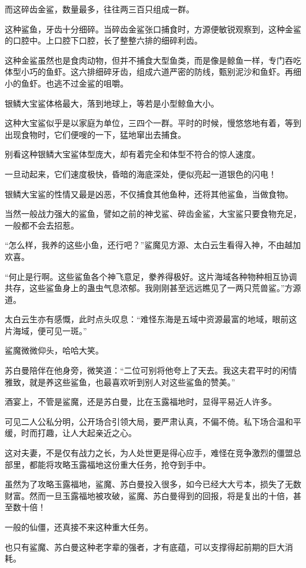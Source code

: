 \begin{this_body}
而这碎齿金鲨，数量最多，往往两三百只组成一群。

这种鲨鱼，牙齿十分细碎。当碎齿金鲨张口捕食时，方源便敏锐观察到，这种金鲨的口腔中。上口腔下口腔，长了整整六排的细碎利齿。

这种金鲨虽然也是食肉动物，但并不捕食大型鱼类，而是像是鲸鱼一样，专门吞吃体型小巧的鱼虾。这六排细碎牙齿，组成六道严密的防线，甄别泥沙和鱼虾。再细小的鱼虾。也逃不过金鲨的咀嚼。

银鳞大宝鲨体格最大，落到地球上，等若是小型鲸鱼大小。

这种大宝鲨似乎是以家庭为单位，三四个一群。平时的时候，慢悠悠地有着，等到出现食物时，它们便嗖的一下，猛地窜出去捕食。

别看这种银鳞大宝鲨体型庞大，却有着完全和体型不符合的惊人速度。

一旦动起来，它们速度极快，昏暗的海底深处，便似亮起一道银色的闪电！

银鳞大宝鲨的性情又最是凶恶，不仅捕食其他鱼种，还将其他鲨鱼，当做食物。

当然一般战力强大的鲨鱼，譬如之前的神戈鲨、碎齿金鲨，大宝鲨只要食物充足，一般都不会去招惹。

“怎么样，我养的这些小鱼，还行吧？”鲨魔见方源、太白云生看得入神，不由越加欢喜。

“何止是行啊。这些鲨鱼各个神飞意足，豢养得极好。这片海域各种物种相互协调共存，这些鲨鱼身上的蛊虫气息浓郁。我刚刚甚至远远瞧见了一两只荒兽鲨。”方源道。

太白云生亦有感慨，此时点头叹息：“难怪东海是五域中资源最富的地域，眼前这片海域，便可见一斑。”

鲨魔微微仰头，哈哈大笑。

苏白曼陪伴在他身旁，微笑道：“二位可别将他夸上了天去。我这夫君平时的闲情雅致，就是养这些鲨鱼，也最喜欢听到别人对这些鲨鱼的赞美。”

酒宴上，不管是鲨魔，还是苏白曼，比在玉露福地时，显得平易近人许多。

可见二人公私分明，公开场合引领大局，要严肃认真，不偏不倚。私下场合温和平缓，时而打趣，让人大起亲近之心。

这对夫妻，不是仅有战力之长，为人处世更是得心应手，难怪在竞争激烈的僵盟总部里，都能将攻略玉露福地这份重大任务，抢夺到手中。

虽然为了攻略玉露福地，鲨魔、苏白曼投入很多，如今已经大大亏本，损失了无数财富。然而一旦玉露福地被攻破，鲨魔、苏白曼得到的回报，将是复出的十倍，甚至数十倍！

一般的仙僵，还真接不来这种重大任务。

也只有鲨魔、苏白曼这种老字辈的强者，才有底蕴，可以支撑得起前期的巨大消耗。


\end{this_body}
